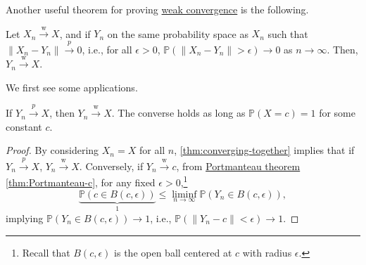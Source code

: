 Another useful theorem for proving \hyperref[def:weak-convergence]{weak convergence} is the following.

\begin{theorem}\label{thm:converging-together}
	Let \(X_n \overset{\text{w} }{\to } X\), and if \(Y_n\) on the same probability space as \(X_n\) such that \(\lVert X_n - Y_n \rVert \overset{p}{\to } 0\), i.e., for all \(\epsilon > 0\), \(\mathbb{P} (\lVert X_n - Y_n \rVert > \epsilon ) \to 0\) as \(n \to \infty\). Then, \(Y_n \overset{\text{w} }{\to } X\).
\end{theorem}

We first see some applications.

\begin{corollary}\label{col:weak-probability-constant}
	If \(Y_n \overset{p}{\to } X\), then \(Y_n \overset{\text{w} }{\to } X\). The converse holds as long as \(\mathbb{P} (X = c) = 1\) for some constant \(c\).
\end{corollary}
\begin{proof}
	By considering \(X_n = X\) for all \(n\), \autoref{thm:converging-together} implies that if \(Y_n \overset{p}{\to } X\), \(Y_n \overset{\text{w} }{\to } X\). Conversely, if \(Y_n \overset{\text{w} }{\to } c\), from \hyperref[thm:Portmanteau]{Portmanteau theorem} \autoref{thm:Portmanteau-c}, for any fixed \(\epsilon > 0\),\footnote{Recall that \(B(c, \epsilon )\) is the open ball centered at \(c\) with radius \(\epsilon \).}
	\[
		\underbrace{\mathbb{P} (c \in B(c, \epsilon ))}_{1}
		\leq \liminf_{n \to \infty} \mathbb{P} (Y_n \in B(c, \epsilon )),
	\]
	implying \(\mathbb{P} (Y_n \in B(c, \epsilon )) \to 1\), i.e., \(\mathbb{P} (\lVert Y_n - c \rVert < \epsilon ) \to 1\).
\end{proof}